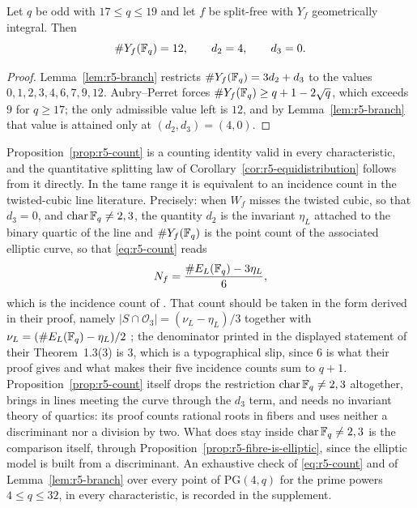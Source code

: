 \begin{corollary}\label{cor:r5-forced}%
%
%
Let $q$ be odd with $17\leq q\leq19$ and let $f$ be split-free with
$Y_f$ geometrically integral.  Then
\[
 \#Y_f(\mathbb F_q)=12,\qquad d_2=4,\qquad d_3=0 .
\]
\end{corollary}

\begin{proof}
Lemma~\ref{lem:r5-branch} restricts $\#Y_f(\mathbb F_q)=3d_2+d_3$ to the
values $0,1,2,3,4,6,7,9,12$.  Aubry--Perret forces
$\#Y_f(\mathbb F_q)\geq q+1-2\sqrt q$, which exceeds $9$ for $q\geq17$; the
only admissible value left is $12$, and by Lemma~\ref{lem:r5-branch}
that value is attained only at $(d_2,d_3)=(4,0)$.
\end{proof}

Proposition~\ref{prop:r5-count} is a counting identity valid in every
characteristic, and the quantitative splitting law of
Corollary~\ref{cor:r5-equidistribution} follows from it directly.  In
the tame range it is equivalent to an incidence count in the
twisted-cubic line literature.  Precisely: when $W_f$ misses the twisted
cubic, so that $d_3=0$, and $\operatorname{char}\mathbb F_q\neq2,3$, the
quantity $d_2$ is the invariant $\eta_L$ attached to the binary quartic
of the line and $\#Y_f(\mathbb F_q)$ is the point count of the associated
elliptic curve, so that \eqref{eq:r5-count} reads
\[
       N_f=\frac{\#E_L(\mathbb F_q)-3\eta_L}{6},
\]
which is the incidence count of \cite{KaipaPradhan2025}.  That count
should be taken in the form derived in their proof, namely
$|S\cap\mathcal O_3|=(\nu_L-\eta_L)/3$ together with
$\nu_L=(\#E_L(\mathbb F_q)-\eta_L)/2$
\cite[Prop.~4.5(3) and Thm.~5.1]{KaipaPradhan2025}; the denominator
printed in the displayed statement of their Theorem~1.3(3) is $3$, which
is a typographical slip, since $6$ is what their proof gives and what
makes their five incidence counts sum to $q+1$.
Proposition~\ref{prop:r5-count} itself drops
the restriction $\operatorname{char}\mathbb F_q\neq2,3$ altogether, brings in
lines meeting the curve through the $d_3$ term, and needs no invariant
theory of quartics: its proof counts rational roots in fibers and uses
neither a discriminant nor a division by two.  What does stay inside
$\operatorname{char}\mathbb F_q\neq2,3$ is the comparison itself, through
Proposition~\ref{prop:r5-fibre-is-elliptic}, since the elliptic model is
built from a discriminant.  An
exhaustive check of \eqref{eq:r5-count} and of
Lemma~\ref{lem:r5-branch} over every point of $\mathrm{PG}(4,q)$ for the
prime powers $4\leq q\leq32$, in every characteristic, is recorded in the
supplement.

